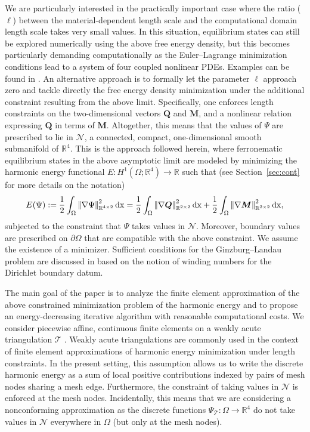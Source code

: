 \documentclass[a4paper,11pt]{article}
\theoremstyle{definition}
\theoremstyle{remark}
\numberwithin{equation}{section}
\newcommand{\Qvec}{{\boldsymbol Q}}
\newcommand{\Mvec}{{\boldsymbol M}}
\newcommand{\dx}{\,{\rm dx}}
\newcommand{\norm}[1]{{\lvert\kern-0.25ex \lvert #1 \rvert\kern-0.25ex \rvert}}
\newcommand{\Real}{\mathbb{R}}
\newcommand{\calN}{\mathcal{N}}
\newcommand{\calT}{\mathcal{T}}
\begin{document}
We are particularly interested in the practically important case where the ratio ($\ell$) between the material-dependent length scale and  the computational domain length scale takes very small values.
In this situation, equilibrium states can still be explored numerically using the above free energy density, but this becomes particularly demanding computationally as the Euler--Lagrange minimization conditions lead to a system of four coupled nonlinear PDEs. Examples can be found in \cite{Ferronematics_2D,FerroRMAMNN2021,Dalby2022}.   An alternative approach is to formally let the parameter $\ell$ approach zero and tackle directly the free energy density minimization under the additional constraint resulting from the above limit. Specifically, one enforces length constraints on the two-dimensional vectors $\Qvec$ and $\Mvec$, and a nonlinear relation expressing $\Qvec$ in terms of $\Mvec$. Altogether, this means that the values of $\Psi$ are prescribed to lie in $\calN$, a connected, compact, one-dimensional smooth submanifold of $\Real^4$. This is the approach followed herein, where ferronematic equilibrium states in the above asymptotic limit are modeled by minimizing the harmonic energy functional $E : H^1(\Omega;\Real^4) \rightarrow \Real$ such that (see Section~\ref{sec:cont} for more details on the notation)
\begin{equation} 
E(\Psi) := \frac12 \int_\Omega \norm{\nabla \Psi}^2_{\Real^{4\times2}} \dx = \frac12 \int_\Omega \norm{\nabla \Qvec}^2_{\Real^{2\times2}} \dx + \frac12 \int_\Omega \norm{\nabla \Mvec}^2_{\Real^{2\times2}} \dx,
\end{equation}
subjected to the constraint that $\Psi$ takes values in $\calN$. Moreover, boundary values are prescribed on $\partial\Omega$ that are compatible with the above constraint. 
We assume the existence of a minimizer.  Sufficient conditions for the Ginzburg--Landau problem are discussed in \cite{Bethuel}  based on the notion of winding numbers for the Dirichlet boundary datum.

The main goal of the paper is to analyze the finite element approximation of the above constrained minimization problem of the harmonic energy and to propose an energy-decreasing iterative algorithm with reasonable computational costs. 
We consider piecewise affine, continuous finite elements on a weakly acute triangulation $\calT$  \cite{Xu1999,Qiang:1998:GL,Brandts2009}. Weakly acute triangulations are commonly used in the context of finite element approximations of harmonic energy minimization under length constraints. In the present setting, this assumption allows us to write the discrete harmonic energy as a sum of local positive contributions indexed by pairs of mesh nodes sharing a mesh edge. Furthermore, the constraint of taking values in $\calN$ is enforced at the mesh nodes. Incidentally, this means that we are considering a nonconforming approximation as the discrete functions $\Psi_\calT:\Omega \rightarrow \Real^4$ do not take values in $\calN$ everywhere in $\Omega$ (but only at the mesh nodes).
\end{document}

